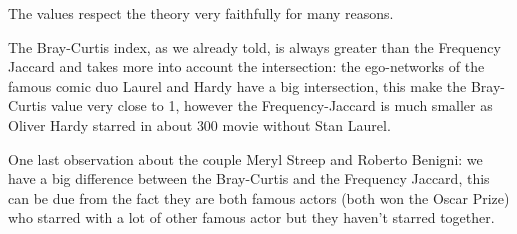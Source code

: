 	The values respect the theory very faithfully for many reasons.
	
	The Bray-Curtis index, as we already told, is always greater than the Frequency Jaccard and takes more into account the intersection:
	the ego-networks of the famous comic duo Laurel and Hardy have a big intersection, this make the Bray-Curtis value very close to 1, however the Frequency-Jaccard is much smaller as Oliver Hardy starred in about $300$ movie without Stan Laurel.
	
	One last observation about the couple Meryl Streep and Roberto Benigni: we have a big difference between the Bray-Curtis and the Frequency Jaccard, this can be due from the fact they are both famous actors (both won the Oscar Prize) who starred with a lot of other famous actor but they haven't starred together.
	
